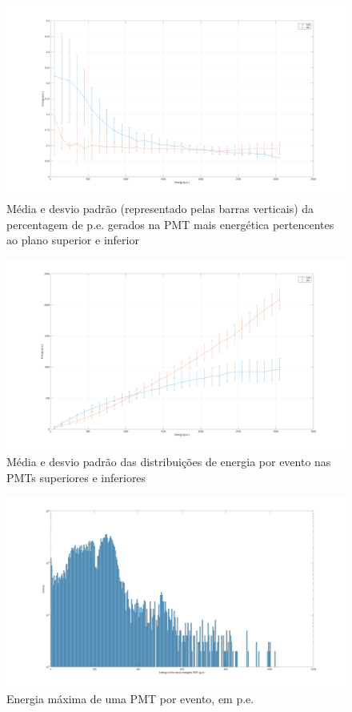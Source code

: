 \begin{figure}[H]
	\centering
	\includegraphics[width=16cm]{postextuais/apendice/simulacao/errorbarene.png}
	\caption{Média e desvio padrão (representado pelas barras verticais) da percentagem de p.e. gerados na PMT mais energética pertencentes ao plano superior e inferior }
	\label{fig:transf}
\end{figure}

\begin{figure}[H]
	\centering
	\includegraphics[width=16cm]{postextuais/apendice/simulacao/errorbarmosten.png}
	\caption{Média e desvio padrão das distribuições de energia por evento nas PMTs superiores e inferiores }
	\label{fig:transf}
\end{figure}

\begin{figure}[H]
	\centering
	\includegraphics[width=16cm]{postextuais/apendice/simulacao/mosten_pmt.png}
	\caption{Energia máxima de uma PMT por evento, em p.e. }
	\label{fig:transf}
\end{figure}